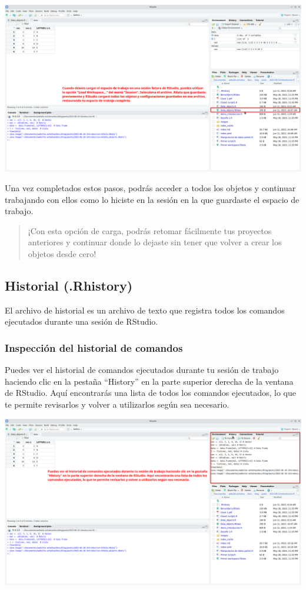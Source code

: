 \documentclass[
  a4paper,
]{article}
\begin{document}
\includegraphics{images/Screenshot_20230611_100949.png}

Una vez completados estos pasos, podrás acceder a todos los objetos y
continuar trabajando con ellos como lo hiciste en la sesión en la que
guardaste el espacio de trabajo.

\begin{quote}
¡Con esta opción de carga, podrás retomar fácilmente tus proyectos
anteriores y continuar donde lo dejaste sin tener que volver a crear los
objetos desde cero!
\end{quote}

\hypertarget{historial-.rhistory}{%
\subsection{Historial (.Rhistory)}\label{historial-.rhistory}}

El archivo de historial es un archivo de texto que registra todos los
comandos ejecutados durante una sesión de RStudio.

\hypertarget{inspecciuxf3n-del-historial-de-comandos}{%
\subsubsection{Inspección del historial de
comandos}\label{inspecciuxf3n-del-historial-de-comandos}}

Puedes ver el historial de comandos ejecutados durante tu sesión de
trabajo haciendo clic en la pestaña ``History'' en la parte superior
derecha de la ventana de RStudio. Aquí encontrarás una lista de todos
los comandos ejecutados, lo que te permite revisarlos y volver a
utilizarlos según sea necesario.

\includegraphics{images/Screenshot_20230611_101644.png}
\end{document}
